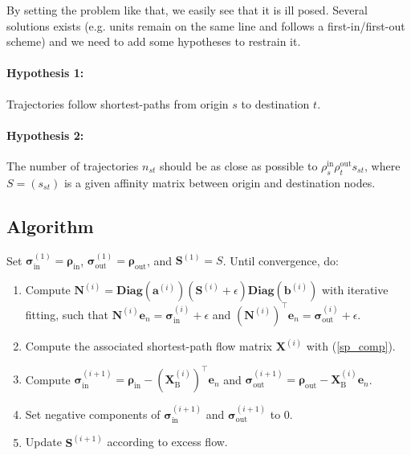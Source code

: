 \documentclass[11p]{article}
\begin{document}
By setting the problem like that, we easily see that it is ill posed. Several solutions exists (e.g. units remain on the same line and follows a first-in/first-out scheme) and we need to add some hypotheses to restrain it.

\paragraph{Hypothesis 1:} Trajectories follow shortest-paths from origin $s$ to destination $t$. \\

\paragraph{Hypothesis 2:} The number of trajectories $n_{st}$ should be as close as possible to $\rho^\text{in}_s \rho^\text{out}_t s_{st}$, where $S = (s_{st})$ is a given affinity matrix between origin and destination nodes. \\

\subsection{Algorithm}
Set $\bm{\sigma}^{(1)}_\text{in} = \bm{\rho}_\text{in}$, $\bm{\sigma}^{(1)}_\text{out} = \bm{\rho}_\text{out}$, and $\mathbf{S}^{(1)} = S$. Until convergence, do:
\begin{enumerate}
	\item Compute $\mathbf{N}^{(i)} = \textbf{Diag}(\mathbf{a}^{(i)}) (\mathbf{S}^{(i)} + \epsilon)\textbf{Diag}(\mathbf{b}^{(i)})$ with iterative fitting, such that $\mathbf{N}^{(i)} \mathbf{e}_n = \bm{\sigma}^{(i)}_\text{in} + \epsilon$ and $\left(\mathbf{N}^{(i)}\right)^\top \mathbf{e}_n = \bm{\sigma}^{(i)}_\text{out}  + \epsilon$.
	\item Compute the associated shortest-path flow matrix $\mathbf{X}^{(i)}$ with (\ref{sp_comp}).
	\item Compute $\bm{\sigma}^{(i+1)}_\text{in} = \bm{\rho}_\text{in} -  (\mathbf{X}^{(i)}_\text{B})^\top \mathbf{e}_n$ and $\bm{\sigma}^{(i+1)}_\text{out} = \bm{\rho}_\text{out} - \mathbf{X}^{(i)}_\text{B} \mathbf{e}_n$. 
	\item Set negative components of $\bm{\sigma}^{(i+1)}_\text{in}$ and $\bm{\sigma}^{(i+1)}_\text{out}$ to 0.
	\item Update $\mathbf{S}^{(i + 1)}$ according to excess flow.
\end{enumerate}
\end{document}
